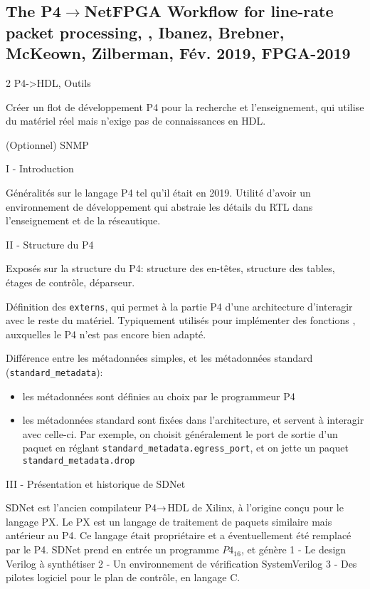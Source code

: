 
\subsection{The P4$\rightarrow$NetFPGA Workflow for line-rate packet processing, \cite{ibanez_p4_2019}, Ibanez, Brebner, McKeown, Zilberman, Fév. 2019, FPGA-2019}
 2
 P4->HDL, Outils

 Créer un flot de développement P4 pour la recherche et l'enseignement, qui utilise du matériel réel mais n'exige pas de connaissances en HDL.

 (Optionnel) SNMP \cite{noauthor_simple_2023} \cite{digitalocean_introduction_nodate}


I - Introduction

Généralités sur le langage P4 tel qu'il était en 2019. Utilité d'avoir un environnement de développement qui abstraie les détails du RTL dans l'enseignement et de la réseautique.

II - Structure du P4

Exposés sur la structure du P4: structure des en-têtes, structure des tables, étages de contrôle, déparseur.

Définition des \texttt{externs}, qui permet à la partie P4 d'une architecture d'interagir avec le reste du matériel. Typiquement utilisés pour implémenter des fonctions , auxquelles le P4 n'est pas encore bien adapté.

Différence entre les métadonnées simples, et les métadonnées standard (\texttt{standard\_metadata}):
\begin{itemize}
	\item les métadonnées sont définies au choix par le programmeur P4
	\item les métadonnées standard sont fixées dans l'architecture, et servent à interagir avec celle-ci. Par exemple, on choisit généralement le port de sortie d'un paquet en réglant \texttt{standard\_metadata.egress\_port}, et on jette un paquet \texttt{standard\_metadata.drop}
\end{itemize}

III - Présentation et historique de SDNet

SDNet est l'ancien compilateur P4$\rightarrow$HDL de Xilinx, à l'origine conçu pour le langage PX. Le PX est un langage de traitement de paquets similaire mais antérieur au P4. Ce langage était propriétaire et a éventuellement été remplacé par le P4. SDNet prend en entrée un programme $P4_{16}$, et génère 1 - Le design Verilog à synthétiser 2 - Un environnement de vérification SystemVerilog 3 - Des pilotes logiciel pour le plan de contrôle, en langage C.

